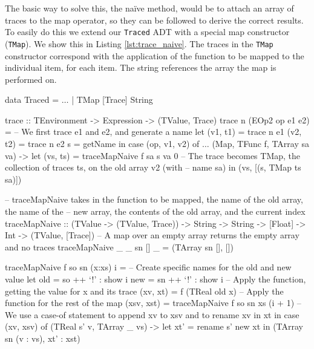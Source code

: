         The basic way to solve this, the naïve method, would be to attach an array of traces to the map operator, so they can be followed to derive the correct results.
        To easily do this we extend our \texttt{Traced} ADT with a special map constructor (\texttt{TMap}).
        We show this in Listing \ref{lst:trace_naive}.
        The traces in the \texttt{TMap} constructor correspond with the application of the function to be mapped to the individual item, for each item.
        The string references the array the map is performed on.

        \begin{haskell}[caption={Tracing map while keeping arrays, naïvely}, label=lst:trace_naive, gobble=12]
            data Traced
                = $\ldots$
                | TMap [Trace] String

            trace :: TEnvironment -> Expression -> (TValue, Trace)
            trace n (EOp2 op e1 e2) =
                -- We first trace e1 and e2, and generate a name
                let (v1, t1) = trace n e1
                    (v2, t2) = trace n e2
                    s = getName
                in  case (op, v1, v2) of
                    $\ldots$
                    (Map, TFunc f, TArray sa va) ->
                        let (vs, ts) = traceMapNaive f sa s va 0
                        -- The trace becomes TMap, the collection of traces ts, on the old array v2 (with  
                        -- name sa)
                        in  (vs, [(s, TMap ts sa)])

            -- traceMapNaive takes in the function to be mapped, the name of the old array, the name of the 
            -- new array, the contents of the old array, and the current index
            traceMapNaive :: (TValue -> (TValue, Trace)) -> String -> String -> [Float]
                -> Int -> (TValue, [Trace])
            -- A map over an empty array returns the empty array and no traces
            traceMapNaive _ _  sn []     _ = (TArray sn [], [])

            traceMapNaive f so sn (x:xs) i =
                -- Create specific names for the old and new value
                let old = so ++ `!' : show i
                    new = sn ++ `!' : show i
                    -- Apply the function, getting the value for x and its trace
                    (xv, xt) = f (TReal old x)
                    -- Apply the function for the rest of the map
                    (xsv, xst) = traceMapNaive f so sn xs (i + 1)
                    -- We use a case-of statement to append xv to xsv and to rename xv in xt
                in  case (xv, xsv) of
                    (TReal s' v, TArray _ vs) ->
                        let xt' = rename s' new xt
                        in  (TArray sn (v : vs), xt' : xst)
        \end{haskell}


